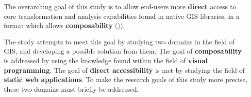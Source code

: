 The overarching goal of this study is to allow end-users more \textbf{direct} access to core transformation and analysis capabilities found in native \ac{GIS} libraries, in a format which allows \textbf{composability} ()).

The study attempts to meet this goal by studying two domains in the field of \ac{GIS}, and developing a possible solution from them.
The goal of \textbf{composability} is addressed by using the knowledge found within the field of \textbf{visual programming}.
The goal of \textbf{direct accessibility} is met by studying the field of \textbf{static web applications}.  
To make the research goals of this study more precise, these two domains must briefly be addressed.


  





  


 






